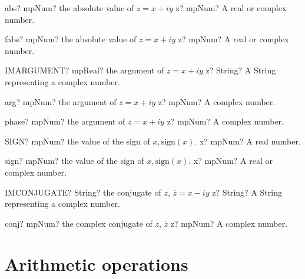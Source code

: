 \documentclass[12pt,a4paper,openany]{book}
\begin{document}
\begin{mpFunctionsExtract}
\mpFunctionOne
{abs? mpNum? the absolute value of $z=x+iy$}
{z? mpNum? A real or complex number.}
\end{mpFunctionsExtract}

\begin{mpFunctionsExtract}
\mpFunctionOne
{fabs? mpNum? the absolute value of $z=x+iy$}
{z? mpNum? A real or complex number.}
\end{mpFunctionsExtract}

\begin{mpFunctionsExtract}
\mpWorksheetFunctionOneNotImplemented
{IMARGUMENT? mpReal? the argument of $z=x+iy$}
{z? String? A String representing a complex number.}
\end{mpFunctionsExtract}

\begin{mpFunctionsExtract}
\mpFunctionOne
{arg? mpNum? the argument of $z=x+iy$}
{z? mpNum? A complex number.}
\end{mpFunctionsExtract}

\begin{mpFunctionsExtract}
\mpFunctionOne
{phase? mpNum? the argument of $z=x+iy$}
{z? mpNum? A complex number.}
\end{mpFunctionsExtract}

\begin{mpFunctionsExtract}
\mpWorksheetFunctionOneNotImplemented
{SIGN? mpNum? the value of the sign of $x, \text{sign}(x)$.}
{x? mpNum? A real number.}
\end{mpFunctionsExtract}

\begin{mpFunctionsExtract}
\mpFunctionOne
{sign? mpNum? the value of the sign of $x, \text{sign}(x)$.}
{x? mpNum? A real or complex number.}
\end{mpFunctionsExtract}

\begin{mpFunctionsExtract}
\mpWorksheetFunctionOneNotImplemented
{IMCONJUGATE? String? the conjugate of $z$, $\overline{z}=x-iy$}
{z? String? A String representing a complex number.}
\end{mpFunctionsExtract}

\begin{mpFunctionsExtract}
\mpFunctionOne
{conj? mpNum? the complex conjugate of $z$, $\overline{z}$}
{z? mpNum? A complex number.}
\end{mpFunctionsExtract}

\section{Arithmetic operations}
\end{document}
